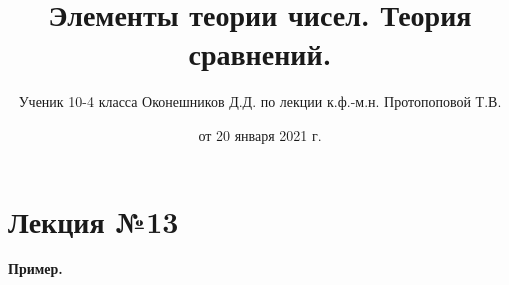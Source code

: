 \documentclass{article}
\begin{document}

    \title{Элементы теории чисел. Теория сравнений.}
    \author{Ученик 10-4 класса Оконешников Д.Д. по лекции к.ф.-м.н. Протопоповой Т.В.}
    \date{от 20 января 2021 г.}
    \maketitle

    \section{Лекция №13}
    \textbf{Пример.} 
    
\end{document}
